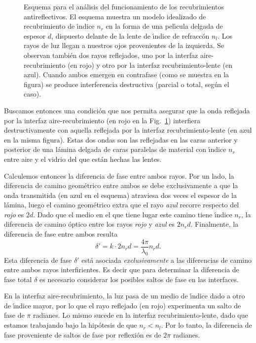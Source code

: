 \documentclass[a4paper]{article}
\begin{document}
\begin{figure}
\vspace{0.5cm}
\caption{Esquema para el an\'alisis del funcionamiento de los recubrimientos
antireflectivos. El esquema muestra un modelo idealizado de recubrimiento
de \'\i ndice $n_r$ en la forma de una pel\'\i cula delgada de espesor
$d$, dispuesto delante de
la lente de \'\i ndice de refracc\'on $n_l$. Los rayos de luz llegan a 
nuestros ojos provenientes de la izquierda. Se observan tambi\'en dos 
rayos reflejados, uno por la interfaz aire-recubrimiento (en rojo) y otro
por la interfaz recubrimiento-lente (en azul). Cuando ambos emergen en
contrafase (como se muestra en la figura) se produce interferencia 
destructiva (parcial o total, seg\'un el caso).}
\label{fa}
\end{figure}

Buscamos entonces una condici\'on que nos permita asegurar que la onda
reflejada por la interfaz aire-recubrimiento (en rojo en la Fig.~\ref{fa})
interfiera destructivamente con aquella reflejada por la interfaz 
recubrimiento-lente (en azul en la misma figura). Estas dos ondas son las
reflejadas en las caras anterior y posterior de una l\'amina delgada de 
caras paralelas de material con \'\i ndice $n_r$ entre aire y el vidrio del
que est\'an hechas las lentes. 

Calculemos entonces la diferencia de fase entre ambos rayos. Por un lado, 
la diferencia de camino geom\'etrico entre ambos se debe exclusivamente a
que la onda transmitida (en azul en el esquema) atraviesa dos veces el espesor
de la l\'amina, luego el camino geom\'etrico extra que el rayo {\it azul}
recorre respecto del {\it rojo} es $2 d$. Dado que el medio en el que tiene
lugar este camino tiene \'\i ndice $n_r$, la diferencia de camino \'optico
entre los rayos {\it rojo} y {\it azul} es $2 n_r d$. Finalmente, la diferencia
de fase entre ambos resulta
\begin{equation*}
    \delta' = k \cdot 2 n_r d = \frac{4 \pi}{\lambda_0} n_r d.
\end{equation*}
Esta diferencia de fase $\delta'$ est\'a asociada {\it exclusivamente} a las
diferencias de camino entre ambos rayos interfirientes. Es decir que para 
determinar la diferencia de fase total $\delta$ es necesario considerar los
posibles saltos de fase en las interfaces. 

En la interfaz aire-recubrimiento, la luz pasa de un medio de \'\i ndice dado 
a otro de \'\i ndice mayor, por lo que el rayo reflejado (en rojo)
experimenta un salto de fase de $\pi$ radianes. Lo mismo sucede en la interfaz
recubrimiento-lente,
dado que estamos trabajando bajo la hip\'otesis de que $n_r < n_l$. Por lo 
tanto, la diferencia de fase proveniente de saltos de fase por 
reflexi\'on es de $2 \pi$ radianes. 
\end{document}
